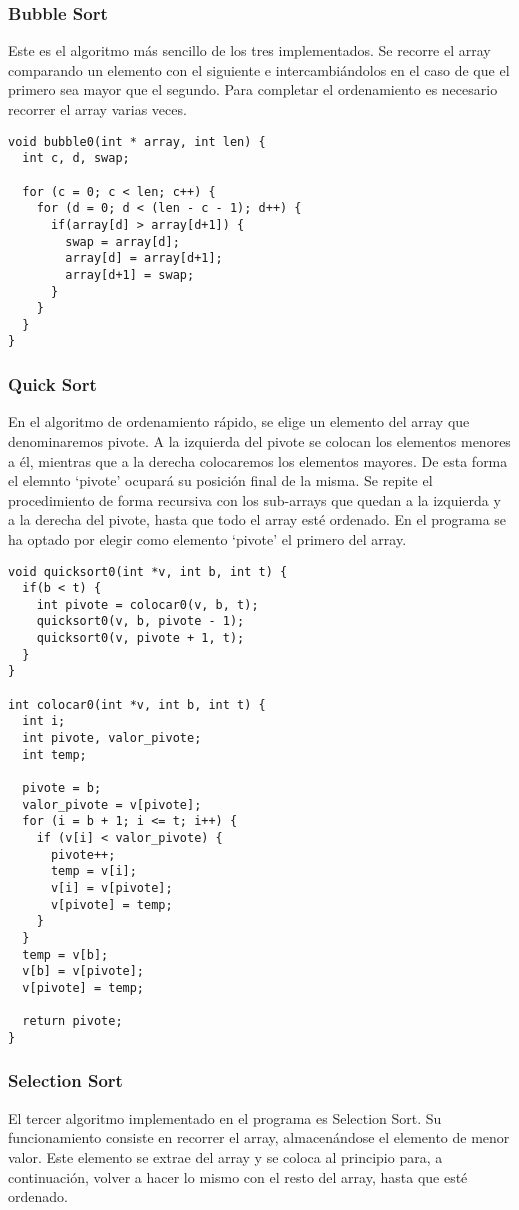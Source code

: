 \subsubsection{Bubble Sort}
Este es el algoritmo más sencillo de los tres implementados. Se recorre el array comparando un elemento con el siguiente e intercambiándolos en el caso de que el primero sea mayor que el segundo. Para completar el ordenamiento es necesario recorrer el array varias veces.
\begin{lstlisting}[caption=Implementación de Bubble Sort]
void bubble0(int * array, int len) {
  int c, d, swap;

  for (c = 0; c < len; c++) {
    for (d = 0; d < (len - c - 1); d++) {
      if(array[d] > array[d+1]) {
        swap = array[d];
        array[d] = array[d+1];
        array[d+1] = swap;
      }
    }
  }
}  
\end{lstlisting}\label{Implementación de Bubble Sort en nuestro programa}

\subsubsection{Quick Sort}
En el algoritmo de ordenamiento rápido, se elige un elemento del array que denominaremos pivote. A la izquierda del pivote se colocan los elementos menores a él, mientras que a la derecha colocaremos los elementos mayores. De esta forma el elemnto `pivote' ocupará su posición final de la misma. Se repite el procedimiento de forma recursiva con los sub-arrays que quedan a la izquierda y a la derecha del pivote, hasta que todo el array esté ordenado. En el programa se ha optado por elegir como elemento `pivote' el primero del array.
\begin{lstlisting}[caption=Implementación de Quick Sort]
void quicksort0(int *v, int b, int t) {
  if(b < t) {
    int pivote = colocar0(v, b, t);
    quicksort0(v, b, pivote - 1);
    quicksort0(v, pivote + 1, t);
  }
}

int colocar0(int *v, int b, int t) {
  int i;
  int pivote, valor_pivote;
  int temp;

  pivote = b;
  valor_pivote = v[pivote];
  for (i = b + 1; i <= t; i++) {
    if (v[i] < valor_pivote) {
      pivote++;
      temp = v[i];
      v[i] = v[pivote];
      v[pivote] = temp;
    }
  }
  temp = v[b];
  v[b] = v[pivote];
  v[pivote] = temp;

  return pivote;
}
\end{lstlisting}

\subsubsection{Selection Sort}
El tercer algoritmo implementado en el programa es Selection Sort. Su funcionamiento consiste en recorrer el array, almacenándose el elemento de menor valor. Este elemento se extrae del array y se coloca al principio para, a continuación, volver a hacer lo mismo con el resto del array, hasta que esté ordenado.

